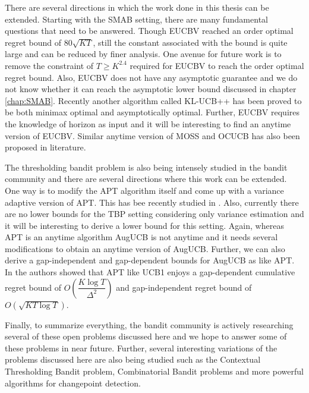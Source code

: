 There are several directions in which the work done in this thesis can be extended. Starting with the SMAB setting, there are many fundamental questions that need to be answered. Though EUCBV reached an order optimal regret bound of $80\sqrt{KT}$, still the constant associated with the bound is quite large and can be reduced by finer analysis. One avenue for future work is to remove the constraint of $T\geq K^{2.4}$ required for EUCBV to reach the order optimal regret bound. Also, EUCBV does not have any asymptotic guarantee and we do not know whether it can reach the \citet{lai1985asymptotically} asymptotic lower bound discussed in chapter \ref{chap:SMAB}. Recently another algorithm called KL-UCB++ \citep{menard2017minimax} has been proved to be both minimax optimal and asymptotically optimal. Further, EUCBV requires the knowledge of horizon as input and it will be interesting to find an anytime version of EUCBV. Similar anytime version of MOSS \citep{degenne2016anytime} and OCUCB \citep{lattimore2016regret} has also been proposed in literature.
    
    The thresholding bandit problem is also being intensely studied in the bandit community and there are several directions where this work can be extended. One way is to modify the APT algorithm itself and come up with a variance adaptive version of APT. This has bee recently studied in \citet{kano2017good}. Also, currently there are no lower bounds for the TBP setting considering only variance estimation and it will be interesting to derive a lower bound for this setting. Again, whereas APT is an anytime algorithm AugUCB is not anytime and it needs several modifications to obtain an anytime version of AugUCB. Further, we can also derive a gap-independent and gap-dependent bounds for AugUCB as like APT. In \citet{lattimore2015optimally} the authors showed that APT like UCB1 enjoys a gap-dependent cumulative regret bound of $O\left( \dfrac{K\log T}{\Delta^2}\right)$ and gap-independent regret bound of $O\left( \sqrt{KT\log T}\right)$.
    
    
    Finally, to summarize everything, the bandit community is actively researching several of these open problems discussed here and we hope to answer some of these problems in near future. Further, several interesting variations of the problems discussed here are also being studied such as the Contextual Thresholding Bandit problem, Combinatorial Bandit problems \citep{cesa2012combinatorial} and more powerful algorithms for changepoint detection.